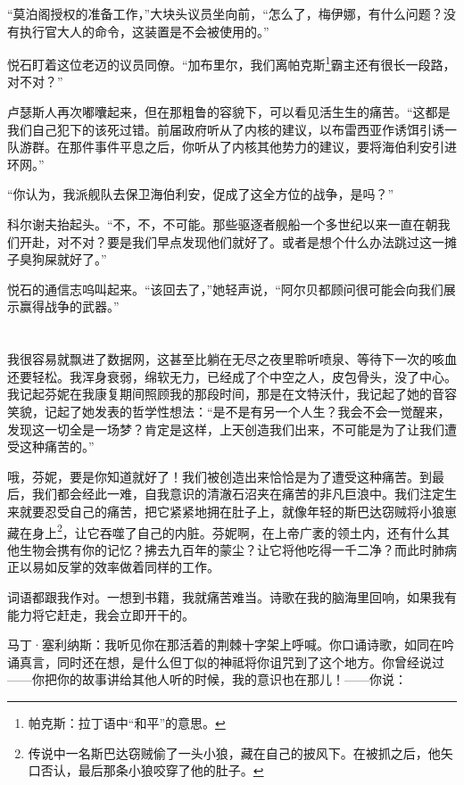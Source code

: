 \documentclass[AutoFakeBold=true]{book}
\begin{document}
``莫泊阁授权的准备工作，''大块头议员坐向前，``怎么了，梅伊娜，有什么问题？没有执行官大人的命令，这装置是不会被使用的。''

悦石盯着这位老迈的议员同僚。``加布里尔，我们离帕克斯\footnote{帕克斯：拉丁语中``和平''的意思。}霸主还有很长一段路，对不对？''

卢瑟斯人再次嘟囔起来，但在那粗鲁的容貌下，可以看见活生生的痛苦。``这都是我们自己犯下的该死过错。前届政府听从了内核的建议，以布雷西亚作诱饵引诱一队游群。在那件事件平息之后，你听从了内核其他势力的建议，要将海伯利安引进环网。''

``你认为，我派舰队去保卫海伯利安，促成了这全方位的战争，是吗？''

科尔谢夫抬起头。``不，不，不可能。那些驱逐者舰船一个多世纪以来一直在朝我们开赴，对不对？要是我们早点发现他们就好了。或者是想个什么办法跳过这一摊子臭狗屎就好了。''

悦石的通信志呜叫起来。``该回去了，''她轻声说，``阿尔贝都顾问很可能会向我们展示赢得战争的武器。''

\chapter{}

我很容易就飘进了数据网，这甚至比躺在无尽之夜里聆听喷泉、等待下一次的咳血还要轻松。我浑身衰弱，绵软无力，已经成了个中空之人，皮包骨头，没了中心。我记起芬妮在我康复期间照顾我的那段时间，那是在文特沃什，我记起了她的音容笑貌，记起了她发表的哲学性想法：{\kaishu ``是不是有另一个人生？我会不会一觉醒来，发现这一切全是一场梦？肯定是这样，上天创造我们出来，不可能是为了让我们遭受这种痛苦的。''}

哦，芬妮，要是你知道就好了！我们被创造出来恰恰是为了遭受这种痛苦。到最后，我们都会经此一难，自我意识的清澈石沼夹在痛苦的非凡巨浪中。我们注定生来就要忍受自己的痛苦，把它紧紧地拥在肚子上，就像年轻的斯巴达窃贼将小狼崽藏在身上\footnote{传说中一名斯巴达窃贼偷了一头小狼，藏在自己的披风下。在被抓之后，他矢口否认，最后那条小狼咬穿了他的肚子。}，让它吞噬了自己的内脏。芬妮啊，在上帝广袤的领土内，还有什么其他生物会携有你的记忆？拂去九百年的蒙尘？让它将他吃得一千二净？而此时肺病正以易如反掌的效率做着同样的工作。

词语都跟我作对。一想到书籍，我就痛苦难当。诗歌在我的脑海里回响，如果我有能力将它赶走，我会立即开干的。

马丁·塞利纳斯：我听见你在那活着的荆棘十字架上呼喊。你口诵诗歌，如同在吟诵真言，同时还在想，是什么但丁似的神祗将你诅咒到了这个地方。你曾经说过——你把你的故事讲给其他人听的时候，我的意识也在那儿！——你说：
\end{document}
